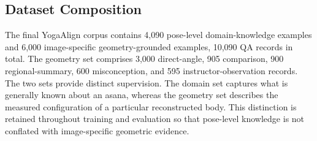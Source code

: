 \subsection{Dataset Composition}
\label{subsec:dataset_composition}

The final YogaAlign corpus contains 4,090 pose-level domain-knowledge examples and 6,000 image-specific geometry-grounded examples, 10,090 QA records in total.
The geometry set comprises 3,000 direct-angle, 905 comparison, 900 regional-summary, 600 misconception, and 595 instructor-observation records.
The two sets provide distinct supervision.
The domain set captures what is generally known about an asana, whereas the geometry set describes the measured configuration of a particular reconstructed body.
This distinction is retained throughout training and evaluation so that pose-level knowledge is not conflated with image-specific geometric evidence.
